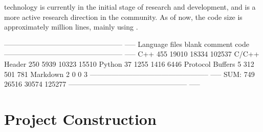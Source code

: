 \begin{content}
 technology is currently in the initial stage of research and development, and is a more active research direction in the community. As of now, the code size is approximately  million lines, mainly using .

\begin{leftbar}
\begin{python}[caption={CompilerCode Stats}]
-------------------------------------------------- -----
Language            files     blank   comment      code
-------------------------------------------------- -----
C++                   455     19010     18334    102537
C/C++ Header          250      5939     10323     15510
Python                 37      1255      1416      6446
Protocol Buffers        5       312       501       781
Markdown 2 0 0 3
-------------------------------------------------- -----
SUM:                  749     26516     30574    125277
-------------------------------------------------- -----
\end{python}
\end{leftbar}

\end{content}

\section{Project Construction}

